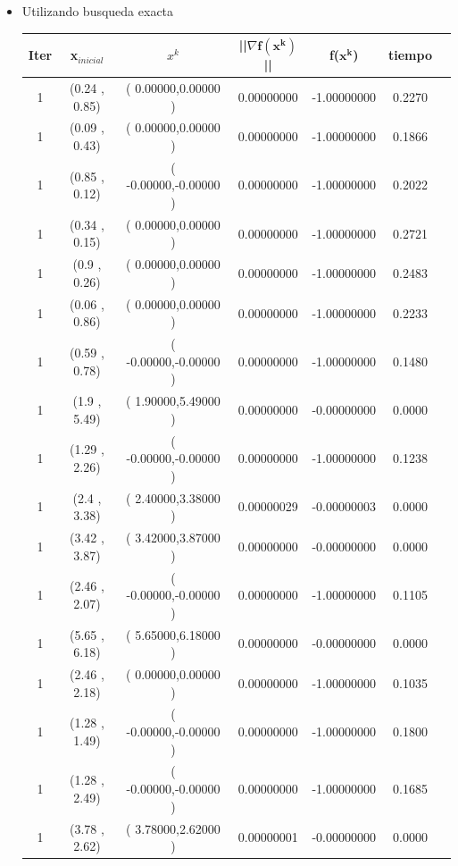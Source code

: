 \begin{itemize}

\item Utilizando busqueda exacta

\begin{table}[H]
\centering
\renewcommand{\arraystretch}{1.2}
\begin{tabular}{|c|c|c|c|c|c|c|}
\hline
\textbf{Iter} & \textbf{x$_{inicial}$}& \textbf{$x^k$} & \textbf{||$\nabla \mathbf{f(x^k)}$}|| & \textbf{f($\mathbf{x^k}$)}& \textbf{tiempo} \\
\hline
1  & (0.24 , 0.85) &( 0.00000,0.00000 ) & 0.00000000 & -1.00000000 & 0.2270 \\
1  & (0.09 , 0.43) &( 0.00000,0.00000 ) & 0.00000000 & -1.00000000 & 0.1866 \\
1  & (0.85 , 0.12) &( -0.00000,-0.00000 ) & 0.00000000 & -1.00000000 & 0.2022 \\
1  & (0.34 , 0.15) &( 0.00000,0.00000 ) & 0.00000000 & -1.00000000 & 0.2721 \\
1  & (0.9 , 0.26) &( 0.00000,0.00000 ) & 0.00000000 & -1.00000000 & 0.2483 \\
1  & (0.06 , 0.86) &( 0.00000,0.00000 ) & 0.00000000 & -1.00000000 & 0.2233 \\
1  & (0.59 , 0.78) &( -0.00000,-0.00000 ) & 0.00000000 & -1.00000000 & 0.1480 \\
1  & (1.9 , 5.49) &( 1.90000,5.49000 ) & 0.00000000 & -0.00000000 & 0.0000 \\
1  & (1.29 , 2.26) &( -0.00000,-0.00000 ) & 0.00000000 & -1.00000000 & 0.1238 \\
1  & (2.4 , 3.38) &( 2.40000,3.38000 ) & 0.00000029 & -0.00000003 & 0.0000 \\
1  & (3.42 , 3.87) &( 3.42000,3.87000 ) & 0.00000000 & -0.00000000 & 0.0000 \\
1  & (2.46 , 2.07) &( -0.00000,-0.00000 ) & 0.00000000 & -1.00000000 & 0.1105 \\
1  & (5.65 , 6.18) &( 5.65000,6.18000 ) & 0.00000000 & -0.00000000 & 0.0000 \\
1  & (2.46 , 2.18) &( 0.00000,0.00000 ) & 0.00000000 & -1.00000000 & 0.1035 \\
1  & (1.28 , 1.49) &( -0.00000,-0.00000 ) & 0.00000000 & -1.00000000 & 0.1800 \\
1  & (1.28 , 2.49) &( -0.00000,-0.00000 ) & 0.00000000 & -1.00000000 & 0.1685 \\
1  & (3.78 , 2.62) &( 3.78000,2.62000 ) & 0.00000001 & -0.00000000 & 0.0000 \\
\hline
\end{tabular}
\end{table}


\end{itemize}
